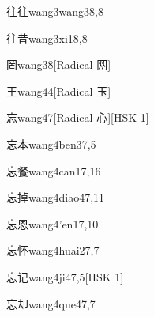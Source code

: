\begin{entry}{往往}{wang3wang3}{8,8}
\end{entry}

\begin{entry}{往昔}{wang3xi1}{8,8}
\end{entry}

\begin{entry}{罔}{wang3}{8}[Radical 网]
\end{entry}

\begin{entry}{王}{wang4}{4}[Radical 玉]
\end{entry}

\begin{entry}{忘}{wang4}{7}[Radical 心][HSK 1]
\end{entry}

\begin{entry}{忘本}{wang4ben3}{7,5}
\end{entry}

\begin{entry}{忘餐}{wang4can1}{7,16}
\end{entry}

\begin{entry}{忘掉}{wang4diao4}{7,11}
\end{entry}

\begin{entry}{忘恩}{wang4'en1}{7,10}
\end{entry}

\begin{entry}{忘怀}{wang4huai2}{7,7}
\end{entry}

\begin{entry}{忘记}{wang4ji4}{7,5}[HSK 1]
\end{entry}

\begin{entry}{忘却}{wang4que4}{7,7}
\end{entry}

